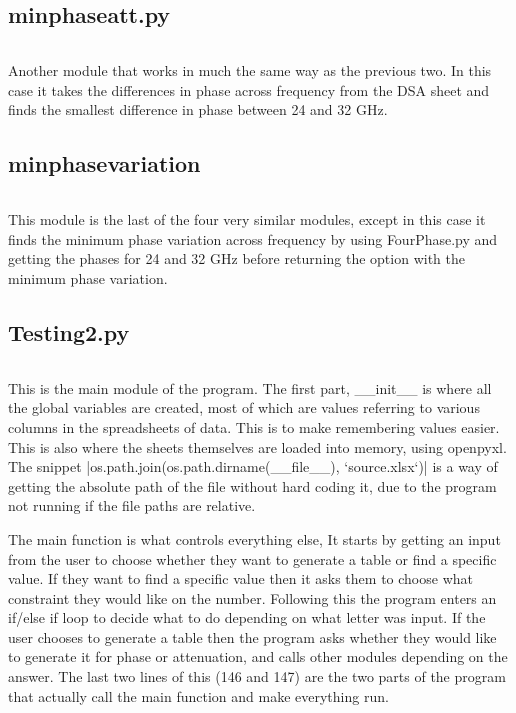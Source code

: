 \documentclass{article}
\begin{document}
\subsection{minphaseatt.py}
\inputminted[linenos, breaklines]{python}{../src/minphaseatt.py}
Another module that works in much the same way as the previous two. In this case it takes the
differences in phase across frequency from the DSA sheet and finds the smallest difference in phase
between 24 and 32 GHz.
\subsection{minphasevariation}
\inputminted[linenos, breaklines]{python}{../src/minphasevariation.py}
This module is the last of the four very similar modules, except in this case it finds the minimum phase variation across frequency by using FourPhase.py and getting the phases for 24 and 32 GHz before returning the option with the minimum phase variation.
\subsection{Testing2.py}
\inputminted[linenos, breaklines]{python}{../Testing2.py}
This is the main module of the program. The first part, \_\_init\_\_ is where all the global
variables are created, most of which are values referring to various columns in the spreadsheets of
data. This is to make remembering values easier. This is also where the sheets themselves are
loaded into memory, using openpyxl. The snippet
|os.path.join(os.path.dirname(__file__), `source.xlsx`)|
is a way of getting the absolute path of the file without hard coding it, due to the program not
running if the file paths are relative.\par The main function is what controls everything else, It
starts by getting an input from the user to choose whether they want to generate a table or find a
specific value. If they want to find a specific value then it asks them to choose what constraint
they would like on the number. Following this the program enters an if/else if loop to decide what
to do depending on what letter was input. If the user chooses to generate a table then the program
asks whether they would like to generate it for phase or attenuation, and calls other modules
depending on the answer. The last two lines of this (146 and 147) are the two parts of the program
that actually call the main function and make everything run.
\end{document}
